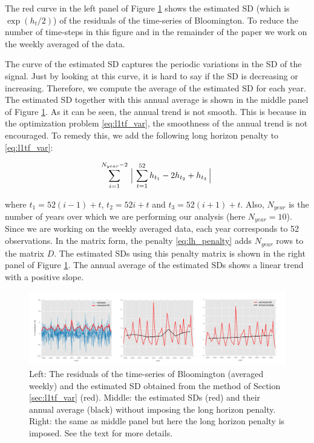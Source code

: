 \documentclass[review]{elsarticle}
\begin{document}
The red curve in the left panel of Figure \ref{fig:bloom_estimatedSD} shows the estimated SD (which is $\exp(h_t/2)$) of the residuals of the time-series of Bloomington. To reduce the number of time-steps in this figure and in the remainder of the paper we work on the weekly averaged of the data. 

The curve of the estimated SD captures the periodic variations in the SD of the signal. Just by looking at this curve, it is hard to say if the SD is decreasing or increasing. Therefore, we compute the average of the estimated SD for each year. The estimated SD together with this annual average is shown in the middle panel of Figure \ref{fig:bloom_estimatedSD}. As it can be seen, the annual trend is not smooth. This is because in the optimization problem \ref{eq:l1tf_var}, the smoothness of the annual trend is not encouraged. To remedy this, we add the following long horizon penalty to \ref{eq:l1tf_var}:

\begin{equation}
\sum_{i=1}^{N_{year}-2} \Big\arrowvert \sum_{t=1}^{52} h_{t_1}-2h_{t_2}+h_{t_3}  \Big\arrowvert
\label{eq:lh_penalty}
\end{equation}

\noindent where $t_1=52(i-1)+t$, $t_2=52i+t$ and $t_3=52(i+1)+t$. Also, $N_{year}$ is the number of years over which we are performing our analysis (here $N_{year}=10$). Since we are working on the weekly averaged data, each year corresponds to 52 observations. In the matrix form, the penalty \ref{eq:lh_penalty} adds $N_{year}$ rows to the matrix $D$. The estimated SDs using this penalty matrix is shown in the right panel of Figure \ref{fig:bloom_estimatedSD}. The annual average of the estimated SDs shows a linear trend with a positive slope.

\begin{figure}[ht]
	\vskip 0.2in
	\begin{center}
		\centerline{\includegraphics[width=\columnwidth]{Figures/bloom_estimatedSD}}
		\caption{Left: The residuals of the time-series of Bloomington (averaged weekly) and the estimated SD obtained from the method of Section \ref{sec:l1tf_var} (red). Middle: the estimated SDs (red) and their annual average (black) without imposing the long horizon penalty. Right: the same as middle panel but here the long horizon penalty is imposed. See the text for more details.}
		\label{fig:bloom_estimatedSD}
	\end{center}
	\vskip -0.2in
\end{figure} 
\end{document}
